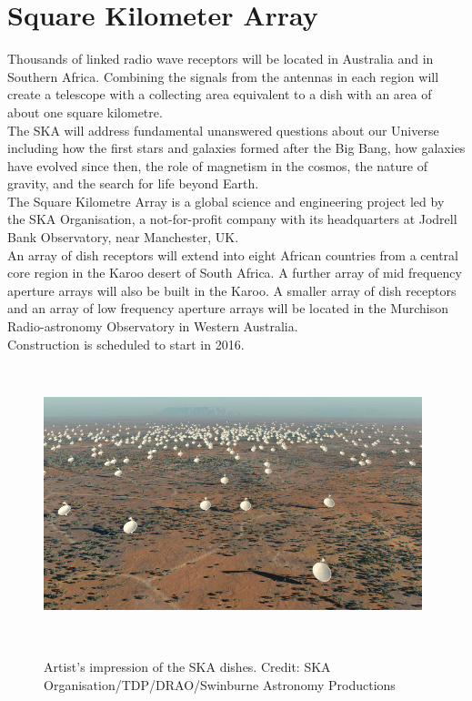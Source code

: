 \section{Square Kilometer Array}


Thousands of linked radio wave receptors will be located in Australia and in Southern Africa. Combining the signals from the antennas in each region will create a telescope with a collecting area equivalent to a dish with an area of about one square kilometre. \\

The SKA will address fundamental unanswered questions about our Universe including how the first stars and galaxies formed after the Big Bang, how galaxies have evolved since then, the role of magnetism in the cosmos, the nature of gravity, and the search for life beyond Earth. \\

The Square Kilometre Array is a global science and engineering project led by the SKA Organisation, a not-for-profit company with its headquarters at Jodrell Bank Observatory, near Manchester, UK. \\

An array of dish receptors will extend into eight African countries from a central core region in the Karoo desert of South Africa. A further array of mid frequency aperture arrays will also be built in the Karoo. A smaller array of dish receptors and an array of low frequency aperture arrays will be located in the Murchison Radio-astronomy Observatory in Western Australia.\\

Construction is scheduled to start in 2016.\\

\begin{figure}
\centering
\includegraphics[width=11cm,height=8cm]{images/ska.jpg}\\
\caption{Artist's impression of the SKA dishes. Credit: SKA Organisation/TDP/DRAO/Swinburne Astronomy Productions}
\end{figure}


